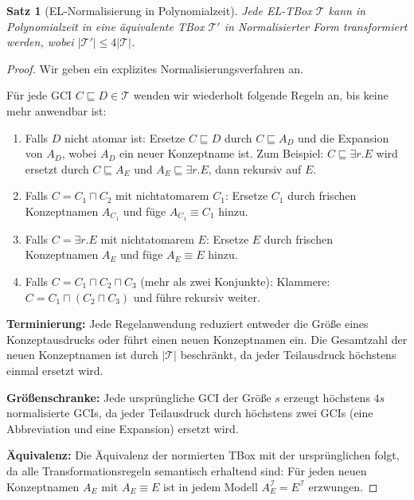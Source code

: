 ﻿\documentclass[a4paper,12pt]{article}
\theoremstyle{definition}
\theoremstyle{plain}
\newtheorem{satz}{Satz}[section]
\theoremstyle{remark}
\newcommand{\Tbox}{\ensuremath{\mathcal{T}}}
\newcommand{\interp}[1]{\ensuremath{\mathcal{#1}}}
\begin{document}
\begin{satz}[EL-Normalisierung in Polynomialzeit]
\label{satz:el-normal}
Jede \textsf{EL}-TBox $\Tbox$ kann in Polynomialzeit in eine
{\"{a}}quivalente TBox $\Tbox'$ in Normalisierter Form transformiert werden,
wobei $|\Tbox'| \leq 4|\Tbox|$.
\end{satz}

\begin{proof}
Wir geben ein explizites Normalisierungsverfahren an.

F{\"{u}}r jede GCI $C \sqsubseteq D \in \Tbox$ wenden wir wiederholt
folgende Regeln an, bis keine mehr anwendbar ist:

\begin{enumerate}[label=(N\arabic*)]
  \item Falls $D$ nicht atomar ist:
        Ersetze $C \sqsubseteq D$ durch
        $C \sqsubseteq A_D$ und die Expansion von $A_D$,
        wobei $A_D$ ein neuer Konzeptname ist.
        Zum Beispiel: $C \sqsubseteq \exists r.E$ wird ersetzt
        durch $C \sqsubseteq A_E$ und $A_E \sqsubseteq \exists r.E$,
        dann rekursiv auf $E$.

  \item Falls $C = C_1 \sqcap C_2$ mit nichtatomarem $C_1$:
        Ersetze $C_1$ durch frischen Konzeptnamen $A_{C_1}$
        und f{\"{u}}ge $A_{C_1} \equiv C_1$ hinzu.

  \item Falls $C = \exists r.E$ mit nichtatomarem $E$:
        Ersetze $E$ durch frischen Konzeptnamen $A_E$
        und f{\"{u}}ge $A_E \equiv E$ hinzu.

  \item Falls $C = C_1 \sqcap C_2 \sqcap C_3$ (mehr als zwei Konjunkte):
        Klammere: $C = C_1 \sqcap (C_2 \sqcap C_3)$
        und f{\"{u}}hre rekursiv weiter.
\end{enumerate}

\textbf{Terminierung:} Jede Regelanwendung reduziert entweder die
Gr{\"{o}}{\ss}e eines Konzeptausdrucks oder f{\"{u}}hrt einen neuen Konzeptnamen ein.
Die Gesamtzahl der neuen Konzeptnamen ist durch $|\Tbox|$ beschr{\"{a}}nkt,
da jeder Teilausdruck h{\"{o}}chstens einmal ersetzt wird.

\textbf{Gr{\"{o}}{\ss}enschranke:} Jede urspr{\"{u}}ngliche GCI der Gr{\"{o}}{\ss}e $s$
erzeugt h{\"{o}}chstens $4s$ normalisierte GCIs, da jeder Teilausdruck
durch h{\"{o}}chstens zwei GCIs (eine Abbreviation und eine Expansion)
ersetzt wird.

\textbf{{\"{A}}quivalenz:} Die {\"{A}}quivalenz der normierten TBox mit
der urspr{\"{u}}nglichen folgt, da alle Transformationsregeln
semantisch erhaltend sind: F{\"{u}}r jeden neuen Konzeptnamen $A_E$
mit $A_E \equiv E$ ist in jedem Modell
$A_E^\interp{I} = E^\interp{I}$ erzwungen.
\qedhere
\end{proof}
\end{document}
